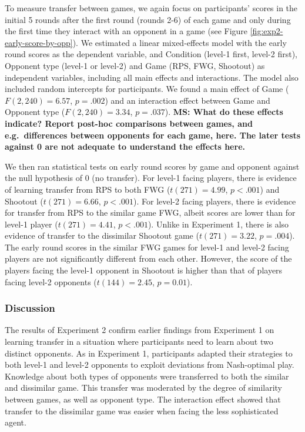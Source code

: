\documentclass[
  english,
  man,floatsintext]{apa6}
\begin{document}
To measure transfer between games, we again focus on participants' scores in the initial 5 rounds after the first round (rounds 2-6) of each game and only during the first time they interact with an opponent in a game (see Figure \ref{fig:exp2-early-score-by-opp}). We estimated a linear mixed-effects model with the early round scores as the dependent variable, and Condition (level-1 first, level-2 first), Opponent type (level-1 or level-2) and Game (RPS, FWG, Shootout) as independent variables, including all main effects and interactions. The model also included random intercepts for participants. We found a main effect of Game (\(F(2,240) = 6.57\), \(p = .002\)) and an interaction effect between Game and Opponent type (\(F(2,240) = 3.34\), \(p = .037\)). \textbf{MS: What do these effects indicate? Report post-hoc comparisons between games, and e.g.~differences between opponents for each game, here. The later tests against 0 are not adequate to understand the effects here.}

We then ran statistical tests on early round scores by game and opponent against the null hypothesis of 0 (no transfer). For level-1 facing players, there is evidence of learning transfer from RPS to both FWG (\(t(271) = 4.99\), \(p < .001\)) and Shootout (\(t(271) = 6.66\), \(p < .001\)). For level-2 facing players, there is evidence for transfer from RPS to the similar game FWG, albeit scores are lower than for level-1 player (\(t(271) = 4.41\), \(p < .001\)). Unlike in Experiment 1, there is also evidence of transfer to the dissimilar Shootout game (\(t(271) = 3.22\), \(p = .004\)). The early round scores in the similar FWG games for level-1 and level-2 facing players are not significantly different from each other. However, the score of the players facing the level-1 opponent in Shootout is higher than that of players facing level-2 opponents (\(t(144) = 2.45\), \(p = 0.01\)).

\hypertarget{discussion-1}{%
\subsubsection{Discussion}\label{discussion-1}}

The results of Experiment 2 confirm earlier findings from Experiment 1 on learning transfer in a situation where participants need to learn about two distinct opponents. As in Experiment 1, participants adapted their strategies to both level-1 and level-2 opponents to exploit deviations from Nash-optimal play. Knowledge about both types of opponents were transferred to both the similar and dissimilar game. This transfer was moderated by the degree of similarity between games, as well as opponent type. The interaction effect showed that transfer to the dissimilar game was easier when facing the less sophisticated agent.
\end{document}
